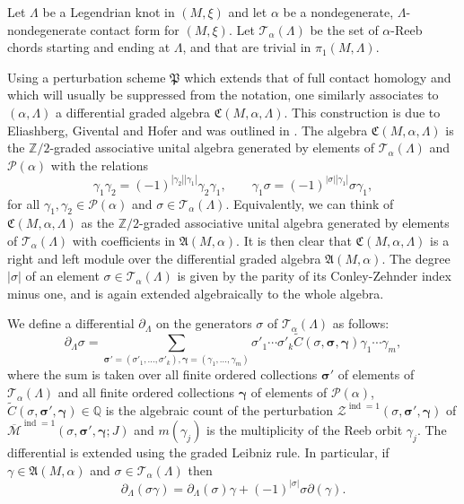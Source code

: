 \documentclass[10pt]{amsart}
\let\mathcal\mathscr
\theoremstyle{plain}
\theoremstyle{definition}
\numberwithin{equation}{subsection}
\let\op\operatorname
\let\bs\boldsymbol
\begin{document}
Let $\Lambda$ be a Legendrian knot in $(M,\xi)$ and let $\alpha$ be a nondegenerate, $\Lambda$-nondegenerate contact form for $(M,\xi)$. Let $\mathcal{T}_\alpha(\Lambda)$ be the set of $\alpha$-Reeb chords starting and ending at $\Lambda$, and that are trivial in $\pi_1(M,\Lambda)$.

Using a perturbation scheme ${\mathfrak P}$ which extends that of full contact homology and which will usually be suppressed from the notation, one similarly associates to $(\alpha,\Lambda)$ a differential graded algebra $\mathfrak{C}(M,\alpha,\Lambda)$. This construction is due to Eliashberg, Givental and Hofer and was outlined in \cite[\S 2.8]{SFT}. The algebra $\mathfrak{C}(M,\alpha,\Lambda)$ is the $\mathbb{Z}/2$\nobreakdash-graded associative unital algebra generated by elements of $\mathcal{T}_\alpha(\Lambda)$ and $\mathcal{P}(\alpha)$ with the relations
\[
\gamma_1 \gamma_2 = (-1)^{|\gamma_2||\gamma_1| } \gamma_2 \gamma_1, \qquad
\gamma_1 \sigma = (-1)^{|\sigma||\gamma_1|} \sigma \gamma_1,
\]
for all $\gamma_1,\gamma_2 \in \mathcal{P}(\alpha)$ and $\sigma \in \mathcal{T}_\alpha(\Lambda)$. Equivalently, we can think of $\mathfrak{C}(M,\alpha,\Lambda)$ as the $\mathbb{Z}/2$-graded associative unital algebra generated by elements of $\mathcal{T}_\alpha(\Lambda)$ with coefficients in $\mathfrak{A}(M,\alpha)$.
It is then clear that $\mathfrak{C}(M,\alpha,\Lambda)$ is a right and left module over the differential graded algebra $\mathfrak{A}(M,\alpha)$. The degree $|\sigma|$ of an element $\sigma\in \mathcal{T}_\alpha(\Lambda)$ is given by the parity of its Conley-Zehnder index minus one, and is again extended algebraically to the whole algebra.

We define a differential $\partial_{\Lambda}$ on the generators $\sigma$ of $\mathcal{T}_\alpha(\Lambda)$ as follows:
\begin{equation}%
\partial_{\Lambda} \sigma = \sum_{\bs\sigma'=(\sigma'_1,\dots,\sigma'_{k}),\bs\gamma=(\gamma_1,\dots,\gamma_m)} \sigma'_1\cdots\sigma'_{k} \widetilde{C}(\sigma,\bs\sigma,\bs\gamma)\gamma_1\cdots\gamma_m,
\end{equation}
where the sum is taken over all finite ordered collections $\bs\sigma'$ of elements of $\mathcal{T}_\alpha(\Lambda)$ and all finite ordered collections $\bs\gamma$ of elements of $\mathcal{P}(\alpha)$, $\widetilde{C}(\sigma,\bs\sigma',\bs\gamma) \in \mathbb{Q}$ is the algebraic count of the perturbation $\mathcal{Z}^{\op{ind}=1}(\sigma,\bs\sigma',\bs\gamma)$ of $\overline{\mathcal{M}}^{\op{ind}=1}(\sigma,\bs\sigma',\bs\gamma;J)$ and $m(\gamma_j)$ is the multiplicity of the Reeb orbit $\gamma_j$. The differential is extended using the graded Leibniz rule. In particular, if $\gamma \in \mathfrak{A}(M,\alpha)$ and $\sigma \in \mathcal{T}_\alpha(\Lambda)$ then
\begin{equation}%
\partial_{\Lambda} (\sigma\gamma) = \partial_{\Lambda}(\sigma)\gamma + (-1)^{|\sigma|}\sigma\partial(\gamma).
\end{equation}
\end{document}
